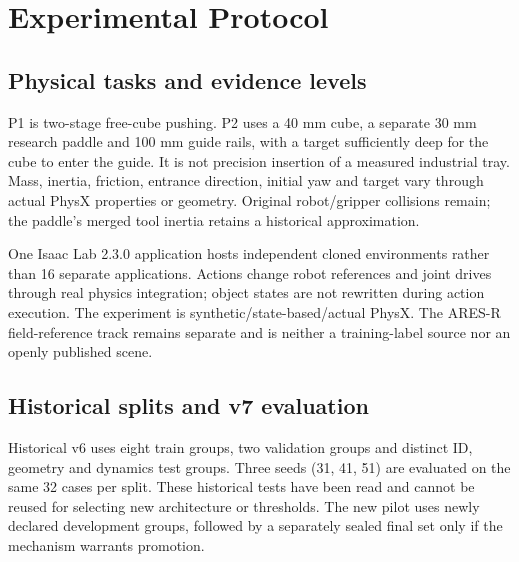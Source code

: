 \section{Experimental Protocol}
\subsection{Physical tasks and evidence levels}
P1 is two-stage free-cube pushing. P2 uses a 40 mm cube, a separate 30 mm research paddle and 100 mm guide rails, with a target sufficiently deep for the cube to enter the guide. It is not precision insertion of a measured industrial tray. Mass, inertia, friction, entrance direction, initial yaw and target vary through actual PhysX properties or geometry. Original robot/gripper collisions remain; the paddle's merged tool inertia retains a historical approximation.

\begin{table}[t]\centering\small
\caption{Historical environment and evidence scope. The v7 pilot extends the actor to 64 inputs; current R1/R2/R3 interfaces are separately versioned below. Generated source: Tab1\_environment.tex.}\label{tab:environment}

\end{table}

One Isaac Lab 2.3.0 application \cite{isaaclab230} hosts independent cloned environments rather than 16 separate applications. Actions change robot references and joint drives through real physics integration; object states are not rewritten during action execution. The experiment is synthetic/state-based/actual PhysX. The ARES-R field-reference track remains separate and is neither a training-label source nor an openly published scene.


\subsection{Historical splits and v7 evaluation}
Historical v6 uses eight train groups, two validation groups and distinct ID, geometry and dynamics test groups. Three seeds (31, 41, 51) are evaluated on the same 32 cases per split. These historical tests have been read and cannot be reused for selecting new architecture or thresholds. The new pilot uses newly declared development groups, followed by a separately sealed final set only if the mechanism warrants promotion.

